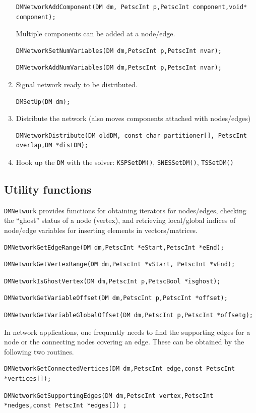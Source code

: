 \begin{enumerate}
\begin{lstlisting}
DMNetworkAddComponent(DM dm, PetscInt p,PetscInt component,void* component);
\end{lstlisting}
  Multiple components can be added at a node/edge.
\begin{lstlisting}
DMNetworkSetNumVariables(DM dm,PetscInt p,PetscInt nvar);
\end{lstlisting}
\begin{lstlisting}
DMNetworkAddNumVariables(DM dm,PetscInt p,PetscInt nvar);
\end{lstlisting}
  \item Signal network ready to be distributed.
\begin{lstlisting}
DMSetUp(DM dm);
\end{lstlisting}
  \item Distribute the network (also moves components attached with nodes/edges)
\begin{lstlisting}
DMNetworkDistribute(DM oldDM, const char partitioner[], PetscInt overlap,DM *distDM);
\end{lstlisting}
\item Hook up the \lstinline{DM} with the solver: \lstinline{KSPSetDM()}, \lstinline{SNESSetDM()}, \lstinline{TSSetDM()}
\end{enumerate}

\subsection{Utility functions}
  \lstinline{DMNetwork} provides functions for obtaining iterators for nodes/edges, checking the ``ghost''
  status of a node (vertex), and retrieving local/global indices of node/edge variables for inserting
  elements in vectors/matrices.
\begin{lstlisting}
DMNetworkGetEdgeRange(DM dm,PetscInt *eStart,PetscInt *eEnd);
\end{lstlisting}
\begin{lstlisting}
DMNetworkGetVertexRange(DM dm,PetscInt *vStart, PetscInt *vEnd);
\end{lstlisting}
\begin{lstlisting}
DMNetworkIsGhostVertex(DM dm,PetscInt p,PetscBool *isghost);
\end{lstlisting}
\begin{lstlisting}
DMNetworkGetVariableOffset(DM dm,PetscInt p,PetscInt *offset);
\end{lstlisting}
\begin{lstlisting}
DMNetworkGetVariableGlobalOffset(DM dm,PetscInt p,PetscInt *offsetg);
\end{lstlisting}
In network applications, one frequently needs to find the supporting edges for a node or
the connecting nodes covering an edge. These can be obtained by the following two routines.
\begin{lstlisting}
DMNetworkGetConnectedVertices(DM dm,PetscInt edge,const PetscInt *vertices[]);
\end{lstlisting}
\begin{lstlisting}
DMNetworkGetSupportingEdges(DM dm,PetscInt vertex,PetscInt *nedges,const PetscInt *edges[]) ;
\end{lstlisting}

